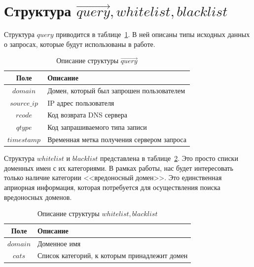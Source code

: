 \documentclass[a4paper,14pt]{extreport} %
\begin{document}
\section{Структура $\vec{query}, whitelist, blacklist$}
Структура $query$ приводится в таблице~\ref{tab:ql}. В ней описаны типы исходных данных о запросах, которые будут использованы в работе.
\label{sec:strq}
\begin{table}[H]
\caption{Описание структуры $\vec{query}$}\label{tab:ql}
\begin{tabular}{| c | l |}
	\hline
	Поле     & Описание                                                                 \\ \hline
	$domain$     & Домен, который был запрошен пользователем    \\ \hline 
	$source\_ip$ & IP адрес пользователя                                           \\ \hline
	$rcode$      & Код возврата DNS сервера                                       \\ \hline
	$qtype$      & Код запрашиваемого типа записи                        \\ \hline
	$timestamp$  & Временная метка получения сервером запроса \\ \hline
		
\end{tabular}
\end{table}


Структура $whitelist$ и $blacklist$ представлена в таблице~\ref{tab:bw}. Это просто списки доменных имен с их категориями. В рамках работы, нас будет интересовать только наличие категории <<вредоносный домен>>. Это единственная априорная информация, которая потребуется для осуществления поиска вредоносных доменов.
\begin{table}[H]
\caption{Описание структуры $whitelist, blacklist$}\label{tab:bw}
\begin{tabular}{| c | l |}
	\hline
	Поле & Описание                                                                    \\ \hline
	$domain$ & Доменное имя                                                             \\ \hline 
	$cats$   & Список категорий, к которым принадлежит домен \\ \hline
		
\end{tabular}
\end{table}
\end{document}
